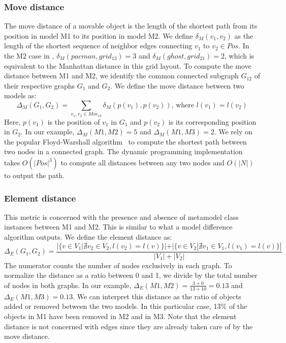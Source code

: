 \subsubsection{Move distance}
The move distance of a movable object is the length of the shortest path from its position in model M1 to its position in model M2.
We define $\delta_M(v_1,v_2)$ as the length of the shortest sequence of neighbor edges connecting $v_1$ to $v_2 \in Pos$.
In the M2 case in , $\delta_M(pacman,grid_{13})=3$ and $\delta_M(ghost,grid_{21})=2$, which is equivalent to the Manhattan distance in this grid layout.
To compute the move distance between M1 and M2, we identify the common connected subgraph $G_{12}$ of their respective graphs $G_1$ and $G_2$.
We define the move distance between two models as:
\[
\Delta_M(G_1,G_2)=\sum_{v_1,v_2 \in Mov_{12}}{\delta_M(p(v_1),p(v_2))} \mbox{, where } l(v_1)=l(v_2)
\]
Here, $p(v_1)$ is the position of $v_1$ in $G_1$ and $p(v_2)$ is its corresponding position in $G_2$.
In our example, $\Delta_M(M1,M2)=5$ and $\Delta_M(M1,M3)=2$.
We rely on the popular Floyd-Warshall algorithm~\cite{Floyd1962,Warshall1962} to compute the shortest path between two nodes in a connected graph.
The dynamic programming implementation takes $O(|Pos|^3)$ to compute all distances between any two nodes and $O(|N|)$ to output the path.


\subsubsection{Element distance}
This metric is concerned with the presence and absence of metamodel class instances between M1 and M2.
This is similar to what a model difference algorithm outputs.
We define the element distance as:
\[
\Delta_E(G_1,G_2)=\frac{|\{v \in V_1 | \nexists v_2 \in V_2, l(v_2)=l(v)\}|+|\{v \in V_2 | \nexists v_1 \in V_1, l(v_1)=l(v)\}|}{|V_1|+|V_2|}
\]
The numerator counts the number of nodes exclusively in each graph.
To normalize the distance as a ratio between 0 and 1, we divide by the total number of nodes in both graphs.
In our example, $\Delta_E(M1,M2)=\frac{3+0}{13+10}=0.13$ and $\Delta_E(M1,M3)=0.13$.
We can interpret this distance as the ratio of objects added or removed between the two models.
In this particular case, 13\% of the objects in M1 have been removed in M2 and in M3.
Note that the element distance is not concerned with edges since they are already taken care of by the move distance.


